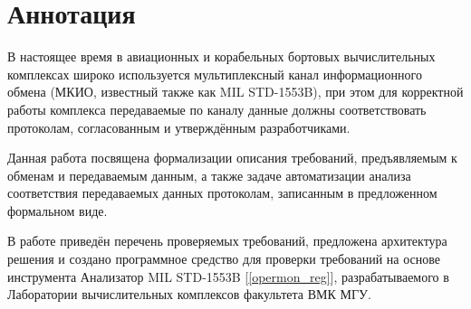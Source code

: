 \section*{Аннотация}

В настоящее время в авиационных и корабельных бортовых вычислительных 
комплексах широко используется мультиплексный канал информационного обмена 
(МКИО, известный также как MIL STD-1553B), при этом для корректной работы 
комплекса передаваемые по каналу данные должны соответствовать протоколам, 
согласованным и утверждённым разработчиками.

Данная работа посвящена формализации описания требований, предъявляемым 
к обменам и передаваемым данным, а также задаче автоматизации анализа 
соответствия передаваемых данных протоколам, записанным в предложенном 
формальном виде.

В работе приведён перечень проверяемых требований, предложена архитектура 
решения и создано программное средство для проверки требований на основе 
инструмента Анализатор MIL STD-1553B [\ref{opermon_reg}], разрабатываемого в 
Лаборатории вычислительных комплексов факультета ВМК МГУ.